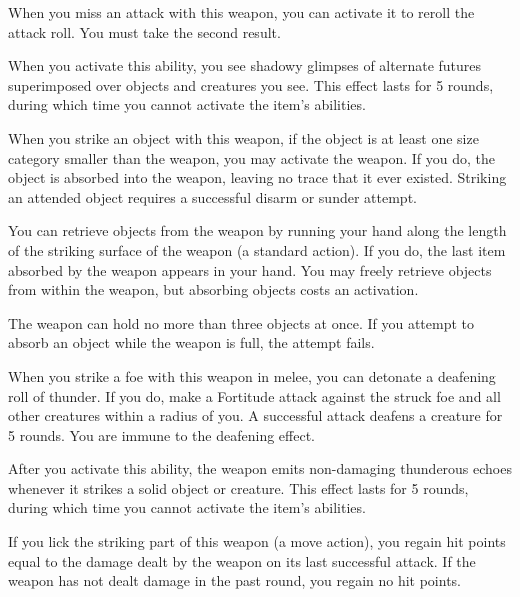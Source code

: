  When you miss an attack with this weapon, you can activate it to reroll the attack roll. You must take the second result.

When you activate this ability, you see shadowy glimpses of alternate futures superimposed over objects and creatures you see. This effect lasts for 5 rounds, during which time you cannot activate the item's abilities.


 When you strike an object with this weapon, if the object is at least one size category smaller than the weapon, you may activate the weapon. If you do, the object is absorbed into the weapon, leaving no trace that it ever existed. Striking an attended object requires a successful disarm or sunder attempt.

You can retrieve objects from the weapon by running your hand along the length of the striking surface of the weapon (a standard action). If you do, the last item absorbed by the weapon appears in your hand. You may freely retrieve objects from within the weapon, but absorbing objects costs an activation.

The weapon can hold no more than three objects at once. If you attempt to absorb an object while the weapon is full, the attempt fails.


 When you strike a foe with this weapon in melee, you can detonate a deafening roll of thunder. If you do, make a Fortitude attack against the struck foe and all other creatures within a \areasmall radius of you. A successful attack deafens a creature for 5 rounds. You are immune to the deafening effect.

After you activate this ability, the weapon emits non-damaging thunderous echoes whenever it strikes a solid object or creature. This effect lasts for 5 rounds, during which time you cannot activate the item's abilities.


 If you lick the striking part of this weapon (a move action), you regain hit points equal to the damage dealt by the weapon on its last successful attack. If the weapon has not dealt damage in the past round, you regain no hit points.


